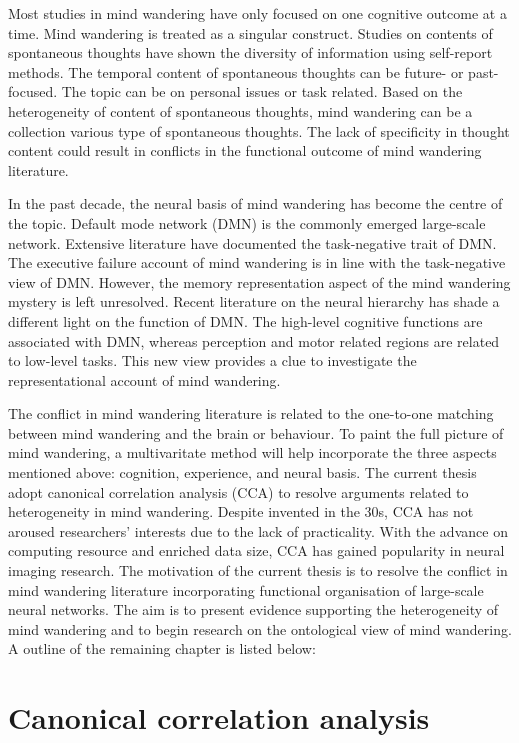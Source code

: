 Most studies in mind wandering have only focused on one cognitive outcome at a time. Mind wandering is treated as a singular construct. Studies on contents of spontaneous thoughts have shown the diversity of information using self-report methods.  The temporal content of spontaneous thoughts can be future- or past-focused. The topic can be on personal issues or task related. Based on the heterogeneity of content of spontaneous thoughts, mind wandering can be a collection various type of spontaneous thoughts. The lack of specificity in thought content could result in conflicts in the functional outcome of mind wandering literature.

In the past decade, the neural basis of mind wandering has become the centre of the topic. Default mode network (DMN) is the commonly emerged large-scale network. Extensive literature have documented the task-negative trait of DMN. The executive failure account of mind wandering is in line with the task-negative view of DMN. However, the memory representation aspect of the mind wandering mystery is left unresolved. Recent literature on the neural hierarchy has shade a different light on the function of DMN. The high-level cognitive functions are associated with DMN, whereas perception and motor related regions are related to low-level tasks. This new view provides a clue to investigate the representational account of mind wandering. 

The conflict in mind wandering literature is related to the one-to-one matching between mind wandering and the brain or behaviour. To paint the full picture of mind wandering, a multivaritate method will help incorporate the three aspects mentioned above: cognition, experience, and neural basis. The current thesis adopt canonical correlation analysis (CCA) to resolve arguments related to heterogeneity in mind wandering. Despite invented in the 30s, CCA has not aroused researchers’ interests due to the lack of practicality. With the advance on computing resource and enriched data size, CCA has gained popularity in neural imaging research. The motivation of the current thesis is to resolve the conflict in mind wandering literature incorporating functional organisation of large-scale neural networks. The aim is to present evidence supporting the heterogeneity of mind wandering and to begin research on the ontological view of mind wandering. A outline of the remaining chapter is listed below: 

\section*{Canonical correlation analysis}

